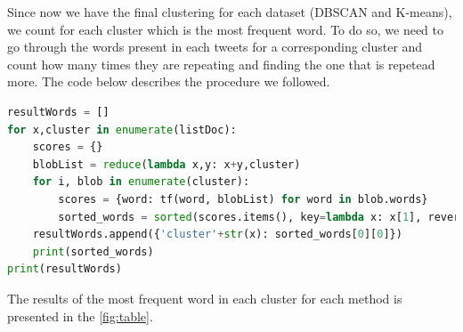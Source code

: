 \documentclass{article}
\begin{document}
Since now we have the final clustering for each dataset (DBSCAN and K-means), we count for each cluster which is the most frequent word. To do so, we need to go through the words present in each tweets for a corresponding cluster and count how many times they are repeating and finding the one that is repetead more. The code below describes the procedure we followed. 

\begin{lstlisting}[language=Python, caption= Mostly used word/cluster, label={lst:Mostly used word/cluster}]
resultWords = []
for x,cluster in enumerate(listDoc):
    scores = {}
    blobList = reduce(lambda x,y: x+y,cluster)
    for i, blob in enumerate(cluster):
        scores = {word: tf(word, blobList) for word in blob.words}
        sorted_words = sorted(scores.items(), key=lambda x: x[1], reverse=True)
    resultWords.append({'cluster'+str(x): sorted_words[0][0]})
    print(sorted_words)
print(resultWords)
 \end{lstlisting}

The results of the most frequent word in each cluster for each method is presented in the \ref{fig:table}.
\end{document}
